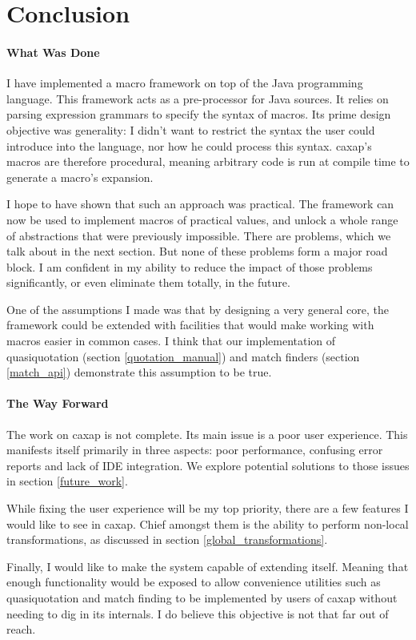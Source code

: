 \chapter{Conclusion}

\subsubsection{What Was Done}

I have implemented a macro framework on top of the Java programming
language. This framework acts as a pre-processor for Java sources. It relies on
parsing expression grammars to specify the syntax of macros. Its prime design
objective was generality: I didn't want to restrict the syntax the user could
introduce into the language, nor how he could process this syntax. caxap's
macros are therefore procedural, meaning arbitrary code is run at compile time
to generate a macro's expansion.

I hope to have shown that such an approach was practical. The framework can now
be used to implement macros of practical values, and unlock a whole range of
abstractions that were previously impossible. There are problems, which we talk
about in the next section. But none of these problems form a major road block. I
am confident in my ability to reduce the impact of those problems significantly,
or even eliminate them totally, in the future.

One of the assumptions I made was that by designing a very general core, the
framework could be extended with facilities that would make working with macros
easier in common cases. I think that our implementation of quasiquotation
(section \ref{quotation_manual}) and match finders (section \ref{match_api})
demonstrate this assumption to be true.

\subsubsection{The Way Forward}

The work on caxap is not complete. Its main issue is a poor user
experience. This manifests itself primarily in three aspects: poor performance,
confusing error reports and lack of IDE integration. We explore potential
solutions to those issues in section \ref{future_work}.

While fixing the user experience will be my top priority, there are a few
features I would like to see in caxap. Chief amongst them is the ability to
perform non-local transformations, as discussed in section
\ref{global_transformations}.

Finally, I would like to make the system capable of extending itself. Meaning
that enough functionality would be exposed to allow convenience utilities such
as quasiquotation and match finding to be implemented by users of caxap without
needing to dig in its internals. I do believe this objective is not that far out
of reach.
